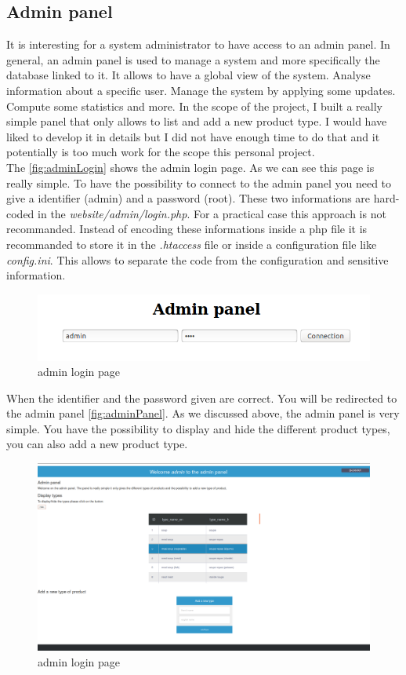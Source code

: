 \subsection{Admin panel}
It is interesting for a system administrator to have access to an admin panel. In general, an admin panel is used to manage a system and more specifically the database linked to it. It allows to have a global view of the system. Analyse information about a specific user. Manage the system by applying some updates. Compute some statistics and more. In the scope of the project, I built a really simple panel that only allows to list and add a new product type. I would have liked to develop it in details but I did not have enough time to do that and it potentially is too much work for the scope this personal project.\\

The \autoref{fig:adminLogin} shows the admin login page. As we can see this page is really simple. To have the possibility to connect to the admin panel you need to give a identifier (admin) and a password (root). These two informations are hard-coded in the \textit{website/admin/login.php}. For a practical case this approach is not recommanded. Instead of encoding these informations inside a php file it is recommanded to store it in the \textit{.htaccess} file or inside a configuration file like \textit{config.ini}. This allows to separate the code from the configuration and sensitive information.
\begin{figure}[H]
\centering
\includegraphics[scale=0.4]{./images/adminLogin.png}
\caption{admin login page}
\label{fig:adminLogin}
\end{figure}

When the identifier and the password given are correct. You will be redirected to the admin panel \autoref{fig:adminPanel}. As we discussed above, the admin panel is very simple. You have the possibility to display and hide the different product types, you can also add a new product type.
\begin{figure}[H]
\centering
\includegraphics[scale=0.25]{./images/adminPanel.png}
\caption{admin login page}
\label{fig:adminPanel}
\end{figure}

